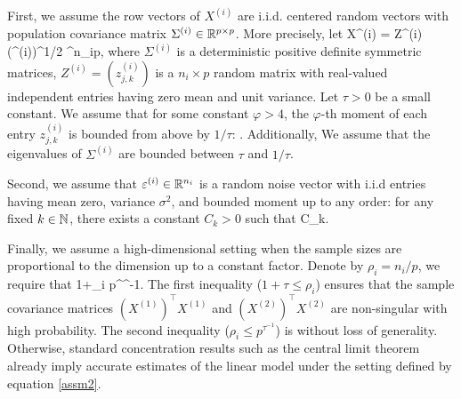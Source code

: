 First, we assume the row vectors of $X^{(i)}$ are i.i.d. centered random vectors with  population covariance matrix $\Sigma^{(i)} \in \mathbb{R}^{p \times p}$. More precisely, let
\be\label{XofZ}
    X^{(i)} = Z^{(i)} (\Sigma^{(i)})^{1/2} \in \real^{n_i\times p},
\ee
where $\Sigma^{(i)}$ is a deterministic positive definite symmetric matrices, $Z^{(i)}=(z^{(i)}_{j,k})$ is a $n_i\times p$ random matrix with real-valued independent entries having zero mean and unit variance.
Let $\tau>0$ be a small constant.
We assume that for some constant $\varphi>4$, the $\varphi$-th moment of each entry $z^{(i)}_{j, k}$ is bounded from above by $1/\tau$:
\be \label{conditionA2}
  \le {}. %
\ee
Additionally, We assume that the eigenvalues of $\Sigma^{(i)}$ are bounded between $\tau$ and $1 / \tau$.
 
Second, we assume that $\varepsilon^{(i)} \in \mathbb{R}^{n_i}$ is a random noise vector with i.i.d entries having mean zero, variance $\sigma^2$, and bounded moment up to any order: for any fixed $k\in \mathbb{N}$, there exists a constant $C_k>0$ such that
\be\label{eq_highmoments}
 \le C_k.
\ee


Finally, we assume a high-dimensional setting when the sample sizes are proportional to the dimension up to a constant factor.
Denote by $\rho_i = n_i / p$, we require that
\be\label{assm2}
1+\tau \le \rho_i \le p^{\tau^{-1}}.
\ee
The first inequality ($1 + \tau \le \rho_i$) ensures that the sample covariance matrices $(X^{(1)})^\top X^{(1)}$ and $(X^{(2)})^\top X^{(2)}$ are non-singular with high probability.
The second inequality ($\rho_i \le p^{\tau^{-1}}$) is without loss of generality.
Otherwise, standard concentration results such as the central limit theorem already imply accurate estimates of the linear model under the setting defined by equation \eqref{assm2}.

